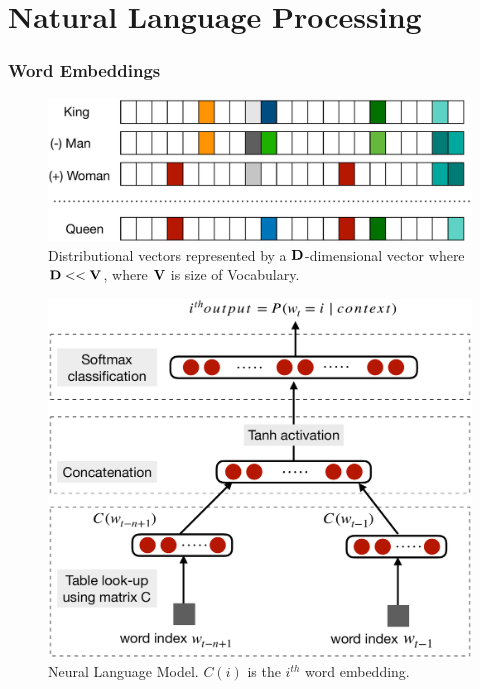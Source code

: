 \documentclass[presentation]{beamer}
\begin{document}
\section{Natural Language Processing\cite{young2018recent}}

\begin{frame}[allowframebreaks]
    \frametitle{Word Embeddings}

    \begin{figure}
        \centering
        \includegraphics[width=\linewidth]{distributional.pdf}
        \caption{Distributional vectors represented by a ${\bf D}$-dimensional vector where ${\bf D} << {\bf V} $, where ${\bf V} $ is size of Vocabulary. }
    \end{figure}

    \begin{figure}
        \centering
        \includegraphics[width=.65\linewidth]{bengio.pdf}
        \caption{Neural Language Model. $C(i)$ is the $i^{th}$ word embedding.}
    \end{figure}
    
\end{frame}


\end{document}
